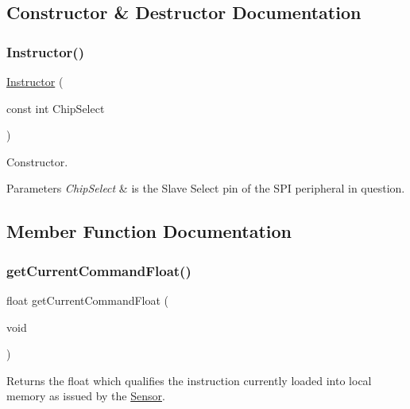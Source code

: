 \subsection{Constructor \& Destructor Documentation}
\mbox{\label{class_instructor_afd38d621d3d07ecb0e9c7f522a1b1823}} 
\subsubsection{\texorpdfstring{Instructor()}{Instructor()}}
{\footnotesize\ttfamily \mbox{\hyperlink{class_instructor}{Instructor}} (\begin{DoxyParamCaption}\item[{const int}]{Chip\+Select }\end{DoxyParamCaption})}



Constructor. 


\begin{DoxyParams}{Parameters}
{\em Chip\+Select} & is the Slave Select pin of the S\+PI peripheral in question. \\
\hline
\end{DoxyParams}


\subsection{Member Function Documentation}
\mbox{\label{class_instructor_ae81f8123893b582fd32a71601471cff8}} 
\subsubsection{\texorpdfstring{getCurrentCommandFloat()}{getCurrentCommandFloat()}}
{\footnotesize\ttfamily float get\+Current\+Command\+Float (\begin{DoxyParamCaption}\item[{void}]{ }\end{DoxyParamCaption})}



Returns the float which qualifies the instruction currently loaded into local memory as issued by the \mbox{\hyperlink{class_sensor}{Sensor}}. 

